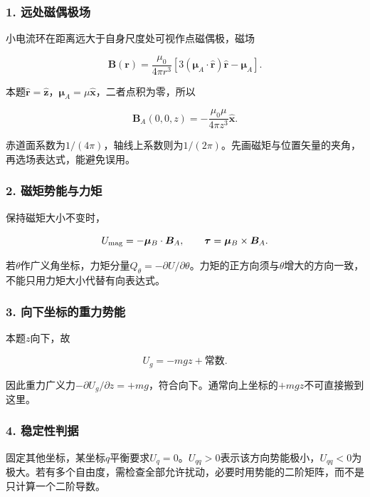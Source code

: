 \documentclass[12pt,a4paper,fontset=fandol]{ctexart}
\begin{document}
\subsubsection{1.
远处磁偶极场}\label{ux8fdcux5904ux78c1ux5076ux6781ux573a}

小电流环在距离远大于自身尺度处可视作点磁偶极，磁场

\[
\boldsymbol B(\boldsymbol r)
=\frac{\mu_0}{4\pi r^3}
\left[3(\boldsymbol\mu_A\cdot\hat{\boldsymbol r})
\hat{\boldsymbol r}-\boldsymbol\mu_A\right].
\]

本题\(\hat{\boldsymbol r}=\hat{\boldsymbol z}\)，\(\boldsymbol\mu_A=\mu\hat{\boldsymbol x}\)，二者点积为零，所以

\[
\boldsymbol B_A(0,0,z)
=-\frac{\mu_0\mu}{4\pi z^3}\hat{\boldsymbol x}.
\]

赤道面系数为\(1/(4\pi)\)，轴线上系数则为\(1/(2\pi)\)。先画磁矩与位置矢量的夹角，再选场表达式，能避免误用。

\subsubsection{2.
磁矩势能与力矩}\label{ux78c1ux77e9ux52bfux80fdux4e0eux529bux77e9}

保持磁矩大小不变时，

\[
U_{\rm mag}=-\boldsymbol\mu_B\cdot\boldsymbol B_A,
\qquad
\boldsymbol\tau=\boldsymbol\mu_B\times\boldsymbol B_A.
\]

若\(\theta\)作广义角坐标，力矩分量\(Q_\theta=-\partial U/\partial\theta\)。力矩的正方向须与\(\theta\)增大的方向一致，不能只用力矩大小代替有向表达式。

\subsubsection{3.
向下坐标的重力势能}\label{ux5411ux4e0bux5750ux6807ux7684ux91cdux529bux52bfux80fd}

本题\(z\)向下，故

\[
U_g=-mgz+\text{常数}.
\]

因此重力广义力\(-\partial U_g/\partial z=+mg\)，符合向下。通常向上坐标的\(+mgz\)不可直接搬到这里。

\subsubsection{4. 稳定性判据}\label{ux7a33ux5b9aux6027ux5224ux636e}

固定其他坐标，某坐标\(q\)平衡要求\(U_q=0\)。\(U_{qq}>0\)表示该方向势能极小，\(U_{qq}<0\)为极大。若有多个自由度，需检查全部允许扰动，必要时用势能的二阶矩阵，而不是只计算一个二阶导数。
\end{document}

